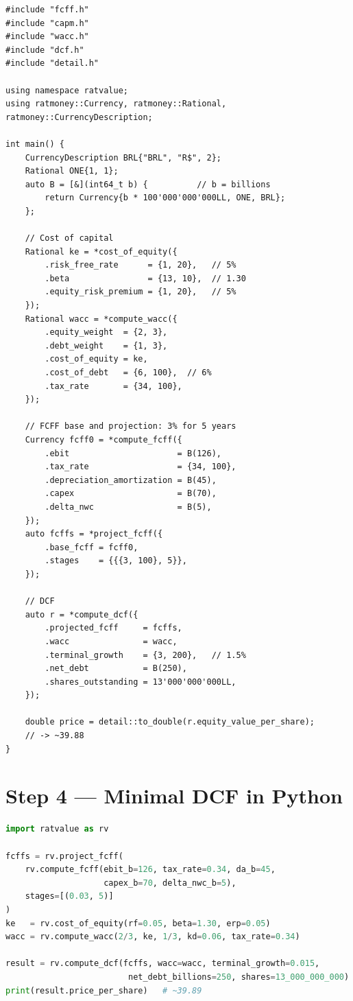 \documentclass[12pt, a4paper, oneside]{book}
\begin{document}
\begin{lstlisting}[style=cpp, caption={Minimal two-stage DCF --- C++}]
#include "fcff.h"
#include "capm.h"
#include "wacc.h"
#include "dcf.h"
#include "detail.h"

using namespace ratvalue;
using ratmoney::Currency, ratmoney::Rational, ratmoney::CurrencyDescription;

int main() {
    CurrencyDescription BRL{"BRL", "R$", 2};
    Rational ONE{1, 1};
    auto B = [&](int64_t b) {          // b = billions
        return Currency{b * 100'000'000'000LL, ONE, BRL};
    };

    // Cost of capital
    Rational ke = *cost_of_equity({
        .risk_free_rate      = {1, 20},   // 5%
        .beta                = {13, 10},  // 1.30
        .equity_risk_premium = {1, 20},   // 5%
    });
    Rational wacc = *compute_wacc({
        .equity_weight  = {2, 3},
        .debt_weight    = {1, 3},
        .cost_of_equity = ke,
        .cost_of_debt   = {6, 100},  // 6%
        .tax_rate       = {34, 100},
    });

    // FCFF base and projection: 3% for 5 years
    Currency fcff0 = *compute_fcff({
        .ebit                      = B(126),
        .tax_rate                  = {34, 100},
        .depreciation_amortization = B(45),
        .capex                     = B(70),
        .delta_nwc                 = B(5),
    });
    auto fcffs = *project_fcff({
        .base_fcff = fcff0,
        .stages    = {{{3, 100}, 5}},
    });

    // DCF
    auto r = *compute_dcf({
        .projected_fcff     = fcffs,
        .wacc               = wacc,
        .terminal_growth    = {3, 200},   // 1.5%
        .net_debt           = B(250),
        .shares_outstanding = 13'000'000'000LL,
    });

    double price = detail::to_double(r.equity_value_per_share);
    // -> ~39.88
}
\end{lstlisting}

\section*{Step 4 --- Minimal DCF in Python}

\begin{lstlisting}[style=cpp, language=Python, numbers=none,
                   caption={Equivalent DCF in Python}]
import ratvalue as rv

fcffs = rv.project_fcff(
    rv.compute_fcff(ebit_b=126, tax_rate=0.34, da_b=45,
                    capex_b=70, delta_nwc_b=5),
    stages=[(0.03, 5)]
)
ke   = rv.cost_of_equity(rf=0.05, beta=1.30, erp=0.05)
wacc = rv.compute_wacc(2/3, ke, 1/3, kd=0.06, tax_rate=0.34)

result = rv.compute_dcf(fcffs, wacc=wacc, terminal_growth=0.015,
                         net_debt_billions=250, shares=13_000_000_000)
print(result.price_per_share)   # ~39.89
\end{lstlisting}
\end{document}
